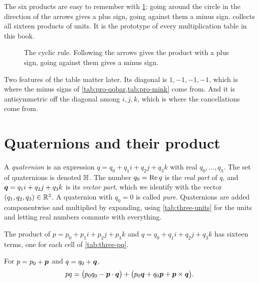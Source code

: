 The six products are easy to remember with \cref{fig:three-cycle}: going around the circle in the direction of the arrows gives a plus sign, going against them a minus sign.  collects all sixteen products of units. It is the prototype of every multiplication table in this book.

\begin{figure}[htbp]
  \centering
  \caption{The cyclic rule. Following the arrows gives the product with a plus sign, going against them gives a minus sign.}
  \label{fig:three-cycle}
\end{figure}


Two features of the table matter later. Its diagonal is $1,-1,-1,-1$, which is where the minus signs of \cref{tab:pro-qqbar,tab:pro-mink} come from. And it is antisymmetric off the diagonal among $i,j,k$, which is where the cancellations come from.

\section{Quaternions and their product}

\begin{definition}\label{def:three-H}
A \emph{quaternion} is an expression $q=q_0+q_1i+q_2j+q_3k$ with real $q_0,\dots,q_3$. The set of quaternions is denoted $\mathbb{H}$. The number $q_0=\operatorname{Re} q$ is the \emph{real part} of $q$, and $\bm{q}=q_1i+q_2j+q_3k$ is its \emph{vector part}, which we identify with the vector $(q_1,q_2,q_3)\in\mathbb{R}^3$. A quaternion with $q_0=0$ is called \emph{pure}. Quaternions are added componentwise and multiplied by expanding, using \cref{tab:three-units} for the units and letting real numbers commute with everything.
\end{definition}

The product of $p=p_0+p_1i+p_2j+p_3k$ and $q=q_0+q_1i+q_2j+q_3k$ has sixteen terms, one for each cell of \cref{tab:three-pq}.


\begin{theorem}\label{thm:three-sv}
For $p=p_0+\bm{p}$ and $q=q_0+\bm{q}$,
\begin{equation}\label{eq:three-sv}
  pq=\bigl(p_0q_0-\bm{p}\cdot\bm{q}\bigr)+\bigl(p_0\bm{q}+q_0\bm{p}+\bm{p}\times\bm{q}\bigr).
\end{equation}
\end{theorem}

